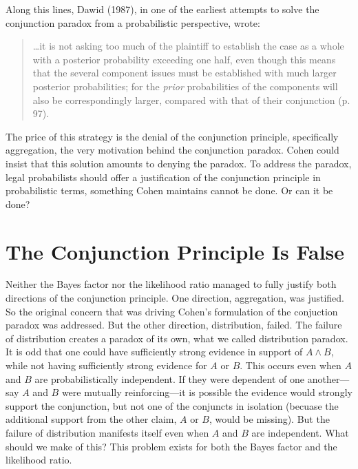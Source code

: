 \documentclass[
  10pt,
  dvipsnames,enabledeprecatedfontcommands]{scrartcl}
\begin{document}
Along this lines, Dawid (1987), in one of the earliest attempts to solve
the conjunction paradox from a probabilistic perspective, wrote:

\begin{quote}
\dots it is not asking too much of the plaintiff to establish the case as a whole with a posterior probability exceeding one half, even though this means  that the several component issues must be established with much larger posterior probabilities; for the \textit{prior}  probabilities of the components will also be correspondingly larger, compared with that of their conjunction (p. 97).
 \end{quote}

\noindent  The price of this strategy is the denial of the conjunction
principle, specifically aggregation, the very motivation behind the
conjunction paradox. Cohen could insist that this solution amounts to
denying the paradox. To address the paradox, legal probabilists should
offer a justification of the conjunction principle in probabilistic
terms, something Cohen maintains cannot be done. Or can it be done?

\hypertarget{the-conjunction-principle-is-false}{%
\section{The Conjunction Principle Is
False}\label{the-conjunction-principle-is-false}}

Neither the Bayes factor nor the likelihood ratio managed to fully
justify both directions of the conjunction principle. One direction,
aggregation, was justified. So the original concern that was driving
Cohen's formulation of the conjuction paradox was addressed. But the
other direction, distribution, failed. The failure of distribution
creates a paradox of its own, what we called distribution paradox. It is
odd that one could have sufficiently strong evidence in support of
\(A\wedge B\), while not having sufficiently strong evidence for \(A\)
or \(B\). This occurs even when \(A\) and \(B\) are probabilistically
independent. If they were dependent of one another---say \(A\) and \(B\)
were mutually reinforcing---it is possible the evidence would strongly
support the conjunction, but not one of the conjuncts in isolation
(becuase the additional support from the other claim, \(A\) or \(B\),
would be missing). But the failure of distribution manifests itself even
when \(A\) and \(B\) are independent. What should we make of this? This
problem exists for both the Bayes factor and the likelihood ratio.
\end{document}
